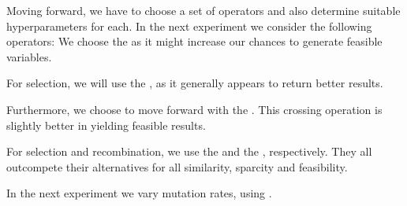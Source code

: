 \documentclass[./../../paper.tex]{subfiles}
\begin{document}
Moving forward, we have to choose a set of operators and also determine suitable hyperparameters for each. In the next experiment we consider the following operators: We choose the  as it might increase our chances to generate feasible variables. 

For selection, we will use the , as it generally appears to return better results. 

Furthermore, we choose to move forward with the . This crossing operation is slightly better in yielding feasible results. 

For selection and recombination, we use the  and the , respectively. They all outcompete their alternatives for all similarity, sparcity and feasibility.

In the next experiment we vary mutation rates, using .
\end{document}
